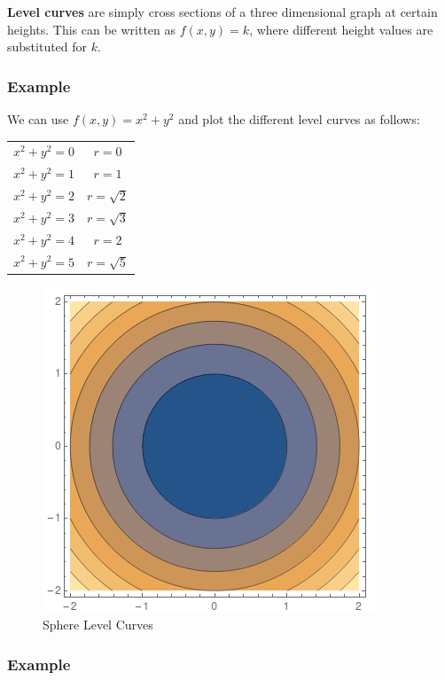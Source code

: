 \documentclass{article}
\begin{document}
\textbf{Level curves} are simply cross sections of a three dimensional graph at
certain heights. This can be written as $ f(x, y) = k $, where different height
values are substituted for $k$.

\subsubsection{ Example }

We can use $ f(x, y) = x^{2} + y^{2} $ and plot the different level curves as
follows:

\begin{center}
  \begin{tabular}{ c c }
    $ x^{2} + y^{2} = 0 $ & $ r = 0 $ \\
    $ x^{2} + y^{2} = 1 $ & $ r = 1 $ \\
    $ x^{2} + y^{2} = 2 $ & $ r = \sqrt{2} $ \\
    $ x^{2} + y^{2} = 3 $ & $ r = \sqrt{3} $ \\
    $ x^{2} + y^{2} = 4 $ & $ r = 2 $ \\
    $ x^{2} + y^{2} = 5 $ & $ r = \sqrt{5} $ \\
  \end{tabular}
\end{center}

\begin{figure}[H]
  \centering
  \includegraphics[scale=0.75]{"SphereLevelCurves"}
  \caption{Sphere Level Curves}
\end{figure}

\subsubsection{ Example }
\end{document}
